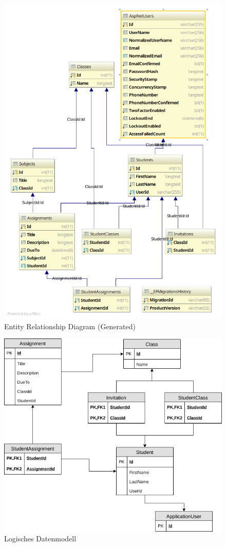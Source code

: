 \documentclass[a4paper, titlepage]{article}
\begin{document}
    \begin{figure}
        \includegraphics[width=\textwidth]{uml2}
        \caption{Entity Relationship Diagram (Generated)}
    \end{figure}

    \begin{figure}
        \includegraphics[width=\textwidth]{uml3}
        \caption{Logisches Datenmodell}
    \end{figure}
\end{document}
